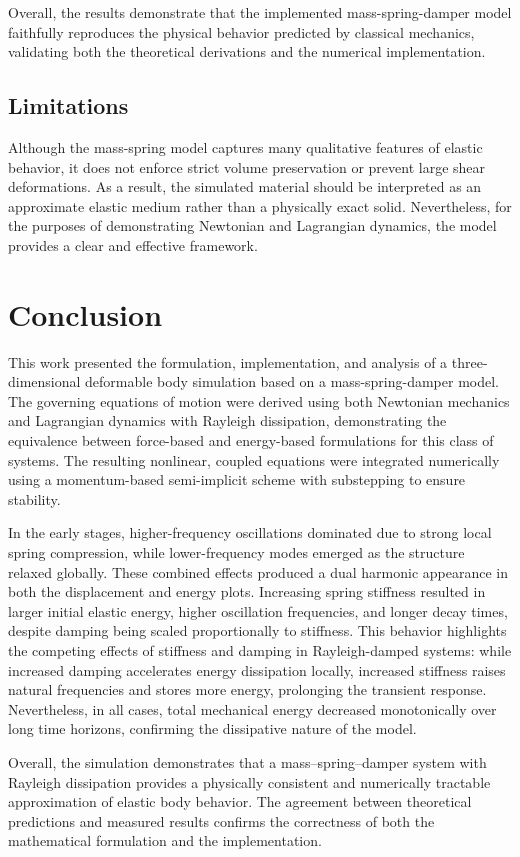 \documentclass[manuscript,nonacm,12pt,letterpaper]{acmart}
\begin{document}
Overall, the results demonstrate that the implemented mass-spring-damper model faithfully reproduces the physical behavior predicted by classical mechanics, validating both the theoretical derivations and the numerical implementation.

\subsection{Limitations}
\label{Sec7.7:Limitations}

Although the mass-spring model captures many qualitative features of elastic behavior, it does not enforce strict volume preservation or prevent large shear deformations. As a result, the simulated material should be interpreted as an approximate elastic medium rather than a physically exact solid. Nevertheless, for the purposes of demonstrating Newtonian and Lagrangian dynamics, the model provides a clear and effective framework.


\section{Conclusion}
\label{Sec8:Conclusion}

This work presented the formulation, implementation, and analysis of a three-dimensional deformable body simulation based on a mass-spring-damper model. The governing equations of motion were derived using both Newtonian mechanics and Lagrangian dynamics with Rayleigh dissipation, demonstrating the equivalence between force-based and energy-based formulations for this class of systems. The resulting nonlinear, coupled equations were integrated numerically using a momentum-based semi-implicit scheme with substepping to ensure stability.

In the early stages, higher-frequency oscillations dominated due to strong local spring compression, while lower-frequency modes emerged as the structure relaxed globally. These combined effects produced a dual harmonic appearance in both the displacement and energy plots. Increasing spring stiffness resulted in larger initial elastic energy, higher oscillation frequencies, and longer decay times, despite damping being scaled proportionally to stiffness. This behavior highlights the competing effects of stiffness and damping in Rayleigh-damped systems: while increased damping accelerates energy dissipation locally, increased stiffness raises natural frequencies and stores more energy, prolonging the transient response. Nevertheless, in all cases, total mechanical energy decreased monotonically over long time horizons, confirming the dissipative nature of the model.

Overall, the simulation demonstrates that a mass--spring--damper system with Rayleigh dissipation provides a physically consistent and numerically tractable approximation of elastic body behavior. The agreement between theoretical predictions and measured results confirms the correctness of both the mathematical formulation and the implementation.

\nocite{*}


\end{document}
